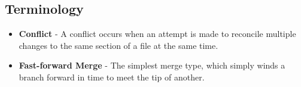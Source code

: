 \subsection{Terminology}
\begin{itemize}

\item\textbf{Conflict} - A conflict occurs when an attempt is made to reconcile multiple changes to the same section of a file at the same time.

\item\textbf{Fast-forward Merge} - The simplest merge type, which simply winds a branch forward in time to meet the tip of another.

\end{itemize}
